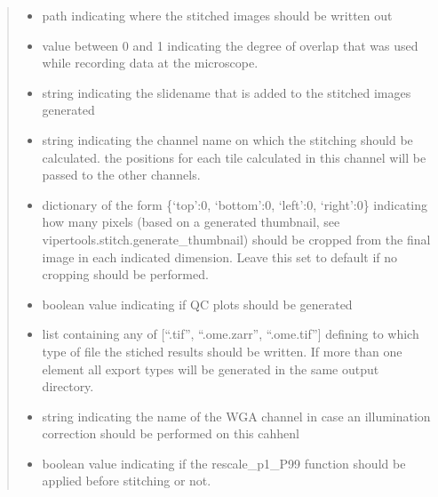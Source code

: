 \documentclass[a4paper,10pt,english,openany,oneside]{sphinxmanual}
\begin{document}
\begin{fulllineitems}
\begin{quote}
\begin{description}
\begin{itemize}
\item {} 
\sphinxAtStartPar
{} \textendash{} path indicating where the stitched images should be written out

\item {} 
\sphinxAtStartPar
{} \textendash{} value between 0 and 1 indicating the degree of overlap that was used while recording data at the microscope.

\item {} 
\sphinxAtStartPar
{} \textendash{} string indicating the slidename that is added to the stitched images generated

\item {} 
\sphinxAtStartPar
{} \textendash{} string indicating the channel name on which the stitching should be calculated. the positions for each tile calculated in this channel will be
passed to the other channels.

\item {} 
\sphinxAtStartPar
{} \textendash{} dictionary of the form \{‘top’:0, ‘bottom’:0, ‘left’:0, ‘right’:0\} indicating how many pixels (based on a generated thumbnail,
see vipertools.stitch.generate\_thumbnail) should be cropped from the final image in each indicated dimension. Leave this set to default
if no cropping should be performed.

\item {} 
\sphinxAtStartPar
{} \textendash{} boolean value indicating if QC plots should be generated

\item {} 
\sphinxAtStartPar
{} \textendash{} list containing any of {[}“.tif”, “.ome.zarr”, “.ome.tif”{]} defining to which type of file the stiched results should be written. If more than one
element all export types will be generated in the same output directory.

\item {} 
\sphinxAtStartPar
{} \textendash{} string indicating the name of the WGA channel in case an illumination correction should be performed on this cahhenl

\item {} 
\sphinxAtStartPar
{} \textendash{} boolean value indicating if the rescale\_p1\_P99 function should be applied before stitching or not.


\end{itemize}
\end{description}
\end{quote}
\end{fulllineitems}
\end{document}

